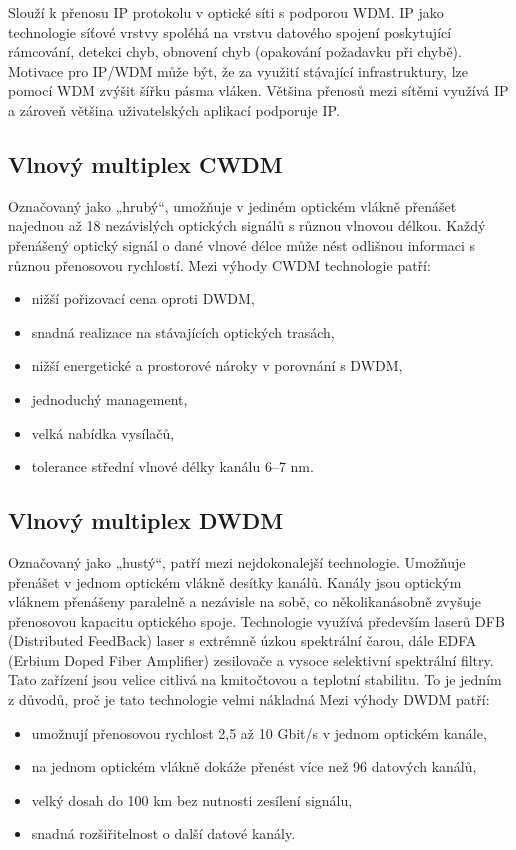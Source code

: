 Slouží k přenosu IP protokolu v optické síti s podporou WDM. IP jako technologie síťové vrstvy spoléhá na vrstvu datového spojení poskytující rámcování, detekci chyb, obnovení chyb (opakování požadavku při chybě). Motivace pro IP/WDM může být, že za využití stávající infrastruktury, lze pomocí WDM zvýšit šířku pásma vláken. Většina přenosů mezi sítěmi využívá IP a zároveň většina uživatelských aplikací podporuje IP.

\subsection{Vlnový multiplex CWDM }
Označovaný jako „hrubý“, umožňuje v jediném optickém vlákně přenášet najednou až 18 nezávislých optických signálů s různou vlnovou délkou. Každý přenášený optický signál o dané vlnové délce může nést odlišnou informaci s různou přenosovou rychlostí.
Mezi výhody CWDM technologie patří:
\begin{itemize}
    \item nižší pořizovací cena oproti DWDM,
    \item snadná realizace na stávajících optických trasách,
    \item nižší energetické a prostorové nároky v porovnání s DWDM,
    \item jednoduchý management,
    \item velká nabídka vysílačů,
    \item tolerance střední vlnové délky kanálu 6–7 nm.
\end{itemize}

\subsection{Vlnový multiplex DWDM}
Označovaný jako „hustý“, patří mezi nejdokonalejší technologie. Umožňuje přenášet v jednom optickém vlákně desítky kanálů. Kanály jsou optickým vláknem přenášeny paralelně a nezávisle na sobě, co několikanásobně zvyšuje přenosovou kapacitu optického spoje. Technologie využívá především laserů DFB (Distributed FeedBack) laser s extrémně úzkou spektrální čarou, dále EDFA (Erbium Doped Fiber Amplifier) zesilovače a vysoce selektivní
spektrální filtry. Tato zařízení jsou velice citlivá na kmitočtovou a teplotní stabilitu. To je jedním z důvodů, proč je tato technologie velmi nákladná
Mezi výhody DWDM patří: 
\begin{itemize}
    \item umožnují přenosovou rychlost 2,5 až 10 Gbit/s v jednom optickém kanále,
    \item na jednom optickém vlákně dokáže přenést více než 96 datových kanálů,
    \item velký dosah do 100 km bez nutnosti zesílení signálu,
    \item snadná rozšiřitelnost o další datové kanály.
\end{itemize}


